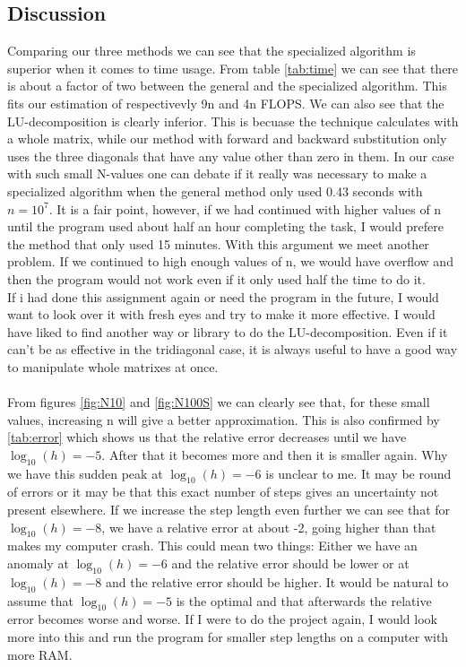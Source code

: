 \documentclass[12pt,a4paper]{article}
\begin{document}
\subsection*{Discussion}
Comparing our three methods we can see that the specialized algorithm is superior when it comes to time usage. From table \ref{tab:time} we can see  that there is about a factor of two between the general and the specialized algorithm. This fits our estimation of respectivevly 9n and 4n FLOPS. We can also see that the LU-decomposition is clearly inferior. This is becuase the technique calculates with a whole matrix, while our method with forward and backward substitution only uses the three diagonals that have any value other than zero in them. In our case with such small N-values one can debate if it really was necessary to make a specialized algorithm when the general method only used 0.43 seconds with $n = 10^7$. It is a fair point, however, if we had continued with higher values of n until the program used about half an hour completing the task, I would prefere the method that only used 15 minutes. With this argument we meet another problem. If we continued to high enough values of n, we would have overflow and then the program would not work even if it only used half the time to do it.  \\ 
If i had done this assignment again or need the program in the future, I would want to look over it with fresh eyes and try to make it more effective. I would have liked to find another way or library to do the LU-decomposition. Even if it can't be as effective in the tridiagonal case, it is always useful to have a good way to manipulate whole matrixes at once. \\ \\
From figures \ref{fig:N10} and \ref{fig:N100S} we can clearly see that, for these small values, increasing n will give a better approximation. This is also confirmed by \ref{tab:error} which shows us that the relative error decreases until we have $\log_{10}(h) = -5$. After that it becomes more and then it is smaller again. Why we have this sudden peak at $\log_{10}(h) = -6$ is unclear to me. It may be round of errors or it may be that this exact number of steps gives an uncertainty not present elsewhere. If we increase the step length even further we can see that for $\log_{10}(h) = -8$, we have a relative error at about -2, going higher than that makes my computer crash. This could mean two things: Either we have an anomaly at $\log_{10}(h) = -6$ and the relative error should be lower or at $\log_{10}(h) = -8$ and the relative error should be higher. It would be natural to assume that $\log_{10}(h) = -5$ is the optimal and that afterwards the relative error becomes worse and worse. If I were to do the project again, I would look more into this and run the program for smaller step lengths on a computer with more RAM.
\end{document}
